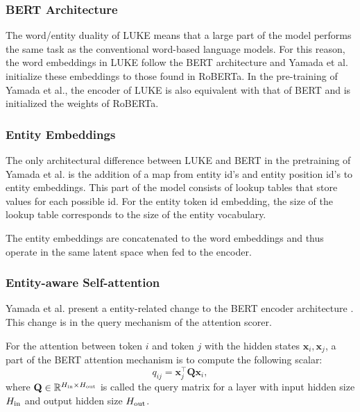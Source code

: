 \documentclass[main.tex]{subfiles}
\begin{document}
\subsubsection{BERT Architecture}
The word/entity duality of LUKE means that a large part of the model performs the same task as the conventional word-based language models.
For this reason, the word embeddings in LUKE follow the BERT architecture and Yamada et al. initialize these embeddings to those found in RoBERTa.
In the pre-training of Yamada et al., the encoder of LUKE is also equivalent with that of BERT and is initialized the weights of RoBERTa.

\subsubsection{Entity Embeddings}
The only architectural difference between LUKE and BERT in the pretraining of Yamada et al. is the addition of a map from entity id's and entity position id's to entity embeddings.
This part of the model consists of lookup tables that store values for each possible id.
For the entity token id embedding, the size of the lookup table corresponds to the size of the entity vocabulary.

The entity embeddings are concatenated to the word embeddings and thus operate in the same latent space when fed to the encoder.

\subsubsection{Entity-aware Self-attention}
Yamada et al. present a entity-related change to the BERT encoder architecture \cite[Sec. 3.2]{yamada2020luke}.
This change is in the query mechanism of the attention scorer.

For the attention between token $i$ and token $j$ with the hidden states $\mathbf x_i, \mathbf x_j$, a part of the BERT attention mechanism is to compute the following scalar:
\begin{equation}
    q_{ij} = \mathbf x_j^\top \mathbf Q \mathbf x_i,
\end{equation}
where $\mathbf Q\in \mathbb R^{H_\textup{in}\times H_\textup{out}}$ is called the query matrix for a layer with input hidden size $H_\textup{in}$ and output hidden size $H_\textup{out}$.
\end{document}
